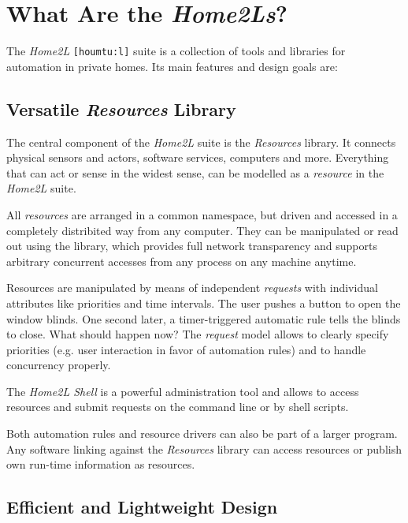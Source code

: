 \documentclass[12pt,english,parskip=half,headheight=19pt]{scrreprt}
\begin{document}
\section{What Are the \textit{Home2Ls}?}
\label{sec:intro-overview}


The \textit{Home2L} \texttt{[houmtu:l]} suite is a collection of tools and libraries for automation in private homes. Its main features and design goals are:


\subsection*{Versatile \textit{Resources} Library}

The central component of the \textit{Home2L} suite is the \textit{Resources} library. It connects physical sensors and actors, software services, computers and more. Everything that can act or sense in the widest sense, can be modelled as a \textit{resource} in the \textit{Home2L} suite.

All \textit{resources} are arranged in a common namespace, but driven and accessed in a completely distribited way from any computer. They can be manipulated or read out using the library, which provides full network transparency and supports arbitrary concurrent accesses from any process on any machine anytime.

Resources are manipulated by means of independent \textit{requests} with individual attributes like priorities and time intervals. The user pushes a button to open the window blinds. One second later, a timer-triggered automatic rule tells the blinds to close. What should happen now? The \textit{request} model allows to clearly specify priorities (e.g. user interaction in favor of automation rules) and to handle concurrency properly.

The \textit{Home2L Shell} is a powerful administration tool and allows to access resources and submit requests on the command line or by shell scripts.

Both automation rules and resource drivers can also be part of a larger program. Any software linking against the \textit{Resources} library can access resources or publish own run-time information as resources.


\subsection*{Efficient and Lightweight Design}
\end{document}
